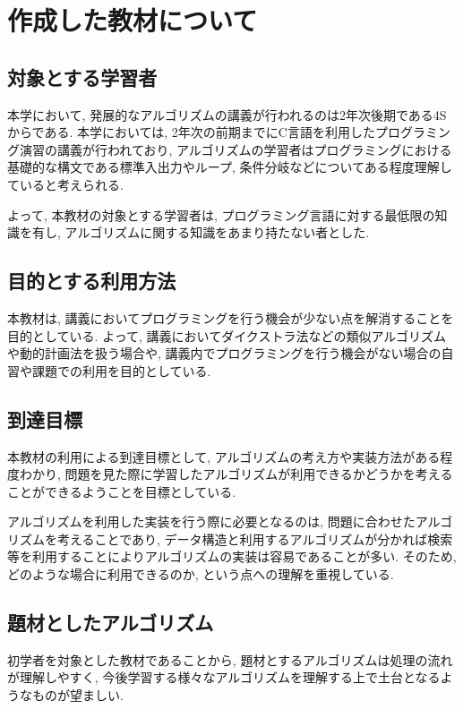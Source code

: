\section{作成した教材について}

\subsection{対象とする学習者}
本学において, 発展的なアルゴリズムの講義が行われるのは2年次後期である4Sからである. 
本学においては, 2年次の前期までにC言語を利用したプログラミング演習の講義が行われており, アルゴリズムの学習者はプログラミングにおける基礎的な構文である標準入出力やループ, 条件分岐などについてある程度理解していると考えられる. 

よって, 本教材の対象とする学習者は, プログラミング言語に対する最低限の知識を有し, アルゴリズムに関する知識をあまり持たない者とした. 

\subsection{目的とする利用方法}
本教材は, 講義においてプログラミングを行う機会が少ない点を解消することを目的としている. 
よって, 講義においてダイクストラ法などの類似アルゴリズムや動的計画法を扱う場合や, 講義内でプログラミングを行う機会がない場合の自習や課題での利用を目的としている. 

\subsection{到達目標}
本教材の利用による到達目標として, アルゴリズムの考え方や実装方法がある程度わかり, 問題を見た際に学習したアルゴリズムが利用できるかどうかを考えることができるようことを目標としている. 

アルゴリズムを利用した実装を行う際に必要となるのは, 問題に合わせたアルゴリズムを考えることであり, データ構造と利用するアルゴリズムが分かれば検索等を利用することによりアルゴリズムの実装は容易であることが多い. 
そのため, どのような場合に利用できるのか, という点への理解を重視している. 

\clearpage

\subsection{題材としたアルゴリズム}

初学者を対象とした教材であることから, 題材とするアルゴリズムは処理の流れが理解しやすく, 今後学習する様々なアルゴリズムを理解する上で土台となるようなものが望ましい. 

